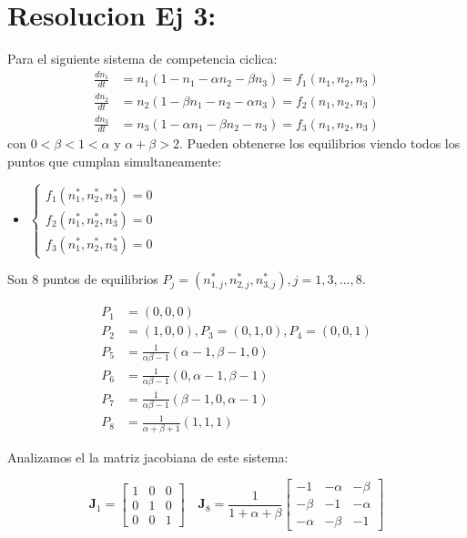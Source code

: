 \documentclass[twocolumn,aps,prl]{revtex4-1}
\newcommand{\nstar}{n^*}
\begin{document}
\section{Resolucion Ej 3:}

Para el siguiente sistema de competencia ciclica:
$$
\begin{aligned}
\frac{d n_{1}}{d t}&=n_{1}\left(1-n_{1}-\alpha n_{2}-\beta n_{3}\right) = f_1(n_1,n_2,n_3)\\
\frac{d n_{2}}{d t}&=n_{2}\left(1-\beta n_{1}-n_{2}-\alpha n_{3}\right) = f_2(n_1,n_2,n_3) \\
\frac{d n_{3}}{d t}&=n_{3}\left(1-\alpha n_{1}-\beta n_{2}-n_{3}\right) = f_3(n_1,n_2,n_3)
\end{aligned}
$$
con $0<\beta<1<\alpha$ y $\alpha+\beta>2$. Pueden obtenerse los  equilibrios viendo todos los puntos que cumplan simultaneamente: 

\begin{itemize}\centering
    \item[] 
    $\left\lbrace
    \begin{aligned}
        f_1(\nstar_1,\nstar_2,\nstar_3) = 0\\ 
        f_2(\nstar_1,\nstar_2,\nstar_3) = 0\\ 
        f_3(\nstar_1,\nstar_2,\nstar_3) = 0   
    \end{aligned}\right.
    $
\end{itemize}


Son 8 puntos de equilibrios $P_j = (\nstar_{1,j},\nstar_{2,j},\nstar_{3,j}), j= 1, 3, ..., 8$.

$$
\begin{aligned}
    P_1 &= (0, 0, 0) \\ 
    P_2 &= (1, 0, 0), P_3 = (0, 1, 0), P_4 = (0, 0, 1) \\
    P_5 &= \frac{1}{\alpha \beta - 1} 
                       (\alpha - 1, \beta - 1 , 0) \\ 
    P_6 &= \frac{1}{\alpha \beta - 1} 
                       (0         , \alpha - 1, \beta - 1) \\ 
    P_7 &= \frac{1}{\alpha \beta - 1} 
                       (\beta - 1 , 0         , \alpha - 1) \\ 
    P_8 &= \frac{1}{\alpha + \beta + 1}(1, 1, 1) 
\end{aligned}
$$

Analizamos el la matriz jacobiana de este sistema:

$$
\mathbf{J}_1 = 
\begin{bmatrix}
    1  & 0 & 0 \\
    0 & 1 & 0 \\
    0 & 0 & 1
\end{bmatrix}
\quad 
\mathbf{J}_8 = 
\frac{1}{1+\alpha+\beta}\begin{bmatrix}
    -1 & -\alpha & -\beta \\
    -\beta & -1 & -\alpha \\
    -\alpha & -\beta & -1
\end{bmatrix}
$$
\end{document}
